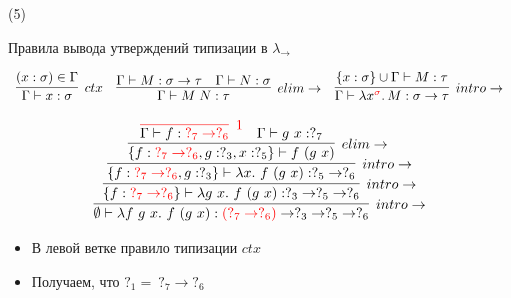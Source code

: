     \begin{frame}[t, noframenumbering]{\btypename (5)}
        \begin{block}{Правила вывода утверждений типизации в $\lambda_{\rightarrow}$}
            \vspace{-1em}
            \begin{center}
                \[
                    \begin{array}{l c r}
                        \infer[ctx]{\Gamma \vdash x: \sigma}{(x: \sigma) \in \Gamma}
                        &
                        \infer[elim\to]{\Gamma \vdash M\;N : \tau}{\Gamma \vdash M : \sigma \to \tau & \Gamma \vdash N : \sigma}
                        &
                        \infer[intro\to]{\Gamma \vdash \lambda x^{\color{red} \sigma}\ldotp M : \sigma \to \tau}{\{x : \sigma\} \cup \Gamma \vdash M : \tau}
                    \end{array}
                \]
            \end{center}
        \end{block}
        \[
            \infer[intro\to]{\emptyset \vdash \lambda f~g~x.~f~(g~x) : {\color{red}(?_7 \to ?_6)} \to ?_3 \to ?_5 \to ?_6}{
                \infer[intro\to]{\{f: {\color{red}?_7 \to ?_6}\} \vdash \lambda g~x.~f~(g~x) : ?_3 \to ?_5 \to ?_6}{
                    \infer[intro\to]{\{f: {\color{red}?_7 \to ?_6}, g: ?_3\} \vdash \lambda x.~f~(g~x) : ?_5 \to ?_6 }{
                        \infer[elim\to]{\{f: {\color{red}?_7 \to ?_6}, g: ?_3, x: ?_5\} \vdash f~(g~x) }{
                            \color{red}
                            \infer[1]{\color{black}\Gamma \vdash f : {\color{red}?_7 \to ?_6}}{} &
                            \Gamma \vdash g~x : ?_7
                        }}}}
        \]
        \vspace{-1em}
        \begin{itemize}
            \item В левой ветке правило типизации $ctx$
            \item Получаем, что $?_1 =~ ?_7 \to ?_6$
        \end{itemize}
    \end{frame}

